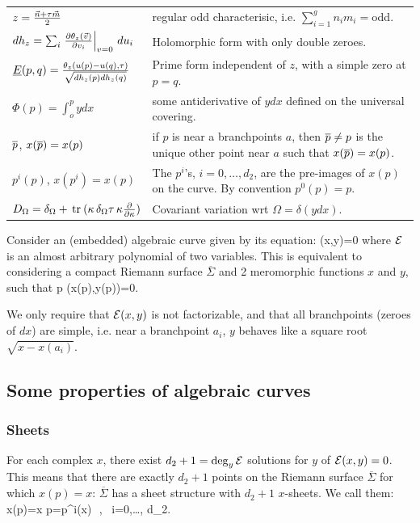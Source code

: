 \begin{tabular}{|l@{ $\,\,\longrightarrow\,\,$ }p{260pt}|}
$z={\vec{n}+\tau\vec{m}\over 2}$ & regular odd characterisic, i.e. $\sum_{i=1}^g n_i m_i =$odd. \\
$dh_z = \sum_i \left. {\partial \theta_z(\vec{v})\over \partial v_i}\right|_{v=0}\,du_i$ & Holomorphic form with only double zeroes. \\
$\underline{{E}}(p,q)={\theta_z(u(p)-u(q),\tau)\over \sqrt{dh_z(p)dh_z(q)}}$ & Prime form independent of $z$, with a simple zero at $p=q$.\\
$\Phi(p)=\int_o^p y dx$ & some antiderivative of $ydx$ defined on the universal covering.\\
$\overline{p}$, $x(\overline{p})=x(p)$ & if $p$ is near a branchpoints $a$, then $\overline{p}\neq p$ is the unique other point near $a$ such that $x(\overline{p})=x(p)$.\\
$p^i(p)$, $x(p^i)=x(p)$ &  The $p^i$'s, $i=0,\dots,d_2$,  are the pre-images of $x(p)$ on the curve. By convention $p^0(p)=p$.\\
$D_\Omega = \delta_\Omega + {\,\rm tr}\: (\kappa \,\delta_\Omega\tau \,\kappa {\partial \over \partial \kappa})$ & Covariant variation wrt $\Omega = \delta(y dx)$.\\
\hline
\end{tabular}

\bigskip

Consider an (embedded) algebraic curve given by its equation:
\beq
\curve(x,y)=0
\eeq
where ${\cal E}$ is an almost arbitrary polynomial of two variables. This is equivalent to considering a compact
Riemann surface $\overline{\Sigma}$ and 2 meromorphic functions $x$ and $y$, such that 
\beq
\forall p \in \overline{\Sigma} \virg \; \curve(x(p),y(p))=0.
\eeq

We only require that ${\cal E}(x,y)$ is  not factorizable, and that all branchpoints (zeroes of $dx$) are simple, i.e. near a branchpoint $a_i$,
$y$ behaves like a square root $\sqrt{x-x(a_i)}$.

\subsection{Some properties of algebraic curves} \label{sectgeomalg}

\subsubsection{Sheets}

For each complex $x$, there exist $d_2+1=\deg_y{\cal E}$ solutions for $y$ of ${\cal E}(x,y)=0$.
This means that there are exactly $d_2+1$ points on the Riemann surface $\overline{\Sigma}$ for which $x(p)=x$:
$\overline{\Sigma}$ has a sheet structure with $d_2+1$ $x$-sheets.
We call them:
\beq
x(p)=x \quad \leftrightarrow\quad p=p^i(x)\,\, ,\,\,\, i=0,\dots, d_2.
\eeq


